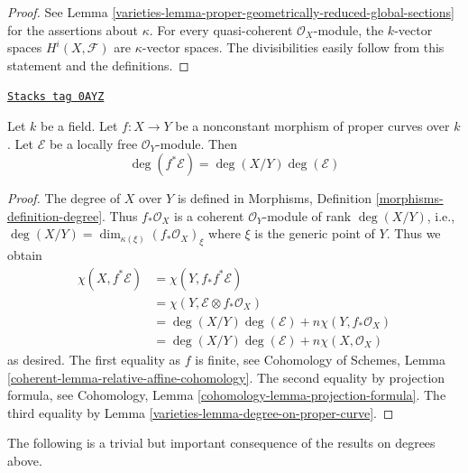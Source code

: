 \begin{proof}

See Lemma \ref{varieties-lemma-proper-geometrically-reduced-global-sections}
for the assertions about $\kappa$.
For every quasi-coherent $\mathcal{O}_X$-module, the
$k$-vector spaces $H^i(X, \mathcal{F})$ are $\kappa$-vector spaces.
The divisibilities easily follow from this statement and the
definitions.
\end{proof}

\begin{lemma}
\label{varieties-lemma-degree-pullback-map-proper-curves}
\href{https://stacks.math.columbia.edu/tag/0AYZ}{\texttt{Stacks tag 0AYZ}}

Let $k$ be a field. Let $f : X \to Y$ be a nonconstant morphism of
proper curves over $k$. Let $\mathcal{E}$ be a locally free
$\mathcal{O}_Y$-module. Then
$$
\deg(f^*\mathcal{E}) = \deg(X/Y) \deg(\mathcal{E})
$$
\end{lemma}

\begin{proof}

The degree of $X$ over $Y$ is defined in
Morphisms, Definition \ref{morphisms-definition-degree}.
Thus $f_*\mathcal{O}_X$ is a coherent $\mathcal{O}_Y$-module
of rank $\deg(X/Y)$, i.e.,
$\deg(X/Y) = \dim_{\kappa(\xi)} (f_*\mathcal{O}_X)_\xi$ where $\xi$
is the generic point of $Y$. Thus we obtain
\begin{align*}
\chi(X, f^*\mathcal{E})
& =
\chi(Y, f_*f^*\mathcal{E}) \\
& =
\chi(Y, \mathcal{E} \otimes f_*\mathcal{O}_X) \\
& =
\deg(X/Y) \deg(\mathcal{E}) + n \chi(Y, f_*\mathcal{O}_X) \\
& =
\deg(X/Y) \deg(\mathcal{E}) + n \chi(X, \mathcal{O}_X)
\end{align*}
as desired. The first equality as $f$ is finite, see
Cohomology of Schemes, Lemma \ref{coherent-lemma-relative-affine-cohomology}.
The second equality by projection formula, see
Cohomology, Lemma \ref{cohomology-lemma-projection-formula}.
The third equality by Lemma \ref{varieties-lemma-degree-on-proper-curve}.
\end{proof}

The following is a trivial but important consequence of the
results on degrees above.

